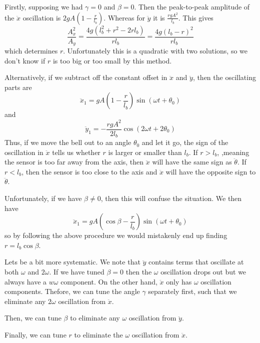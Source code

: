 \documentclass{article}
\begin{document}
Firstly, supposing we had $\gamma = 0$ and $\beta=0$. Then
the peak-to-peak amplitude of the $\ddot{x}$ oscillation is 
$2gA(1-\frac{r}{l_b})$. Whereas for $\ddot{y}$ it is
$\frac{rgA^2}{l_b}$.
This gives
\begin{equation}
\frac{A_x^2}{A_y} = \frac{4 g (l_b^2 + r^2 - 2 r l_b)}{r l_b} = \frac{4g(l_b - r)^2}{r l_b}
\end{equation}
which determines $r$. Unfortunately this is a quadratic with two solutions, so we don't know if
$r$ is too big or too small by this method.

Alternatively, if we subtract off the constant offset in $\ddot{x}$ and $\ddot{y}$, then the oscillating parts
are
\begin{equation}
\ddot{x}_1 = gA (1 -\frac{r}{l_b}) \sin(\omega t + \theta_0)
\end{equation}
and
\begin{equation}
\ddot{y}_1 = -\frac{rgA^2}{2l_b} \cos(2 \omega t + 2 \theta_0)
\end{equation}
Thus, if we move the bell out to an angle $\theta_0$ and let it go, the sign of the oscillation in $\ddot{x}$
tells us whether $r$ is larger or smaller than $l_b$. If $r > l_b$, ,meaning the sensor is
too far away from the axis, then $\ddot{x}$ will have the same sign as $\ddot{\theta}$.
If $r < l_b$, then the sensor is too close to the axis and $\ddot{x}$ will 
have the opposite sign to $\ddot{\theta}$.

Unfortunately, if we have $\beta \neq 0$, then this will confuse the situation.  We then have
\begin{equation}
\ddot{x}_1 = gA (\cos \beta -\frac{r}{l_b}) \sin(\omega t + \theta_0)
\end{equation}
so by following the above procedure we would mistakenly end up finding $r = l_b \cos \beta$. 

Lets be a bit more systematic.  We note that $\ddot{y}$ contains terms that oscillate at both 
$\omega$ and $2 \omega$. If we have tuned $\beta = 0$ then the $\omega$ oscillation drops out but we
always have a $w \omega$ component. On the other hand, $\ddot{x}$ only has $\omega$ oscillation components.
Thefore, we can tune the angle $\gamma$ separately first, such that we eliminate any $2 \omega$
oscillation from $\ddot{x}$.

Then, we can tune $\beta$ to eliminate any $\omega$ oscillation from $\ddot{y}$.

Finally, we can tune $r$ to eliminate the $\omega$ oscillation from $\ddot{x}$.
\end{document}
